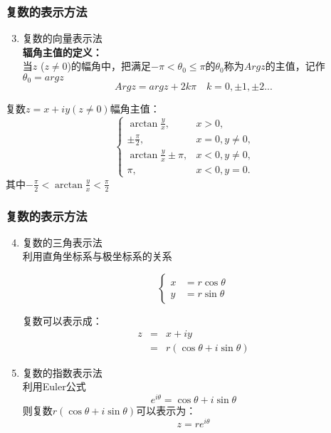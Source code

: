 \documentclass{beamer}
\begin{document}
\begin{frame}[t]
\frametitle{复数的表示方法}
\begin{enumerate}
\setcounter{enumi}{2}
\item 复数的向量表示法\\

\textbf{辐角主值的定义：}\\
当$z$ ($z \neq 0$)的幅角中，把满足$-\pi < \theta_0 \leq \pi$的$\theta_0$称为$Argz$的主值，记作$\theta_0 = argz$
$$Argz = argz + 2k\pi \quad k=0, \pm1, \pm2 ...$$
\end{enumerate}
复数$z = x + iy (z \neq 0) $幅角主值：\\


\[ \begin{cases}
\arctan \frac{y}{x}, & x>0, \\
\pm \frac{\pi}{2}, & x=0, y \neq 0, \\
\arctan \frac{y}{x} \pm \pi, & x<0, y \neq 0, \\
\pi, & x< 0, y=0.
\end{cases} \]
其中$-\frac{\pi}{2}<\arctan{\frac{y}{x}}<\frac{\pi}{2}$
\end{frame}

\begin{frame}[t]
\frametitle{复数的表示方法}
\begin{enumerate}
\setcounter{enumi}{3}
\item 复数的三角表示法\\
利用直角坐标系与极坐标系的关系


\begin{equation}
 \left\{
\begin{array}{ll}
x & = r\cos{\theta}\\
y & = r\sin{\theta}

\end{array}
\nonumber
\right.
\end{equation}

复数可以表示成：
\begin{eqnarray}
z &=& x+iy \nonumber\\
&=& r(\cos{\theta}+i\sin{\theta})
\nonumber
\end{eqnarray}

\item 复数的指数表示法\\
利用Euler公式
$$e^{i\theta} = \cos{\theta}+i\sin{\theta}$$
则复数$r(\cos{\theta}+i\sin{\theta})$可以表示为：
$$z = re^{i\theta}$$
\end{enumerate}
\end{frame}
\end{document}
